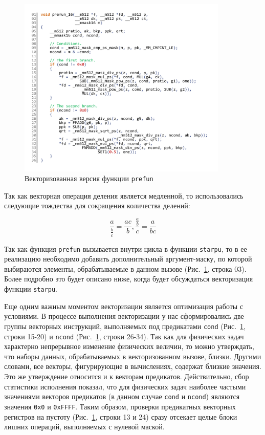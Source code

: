 \documentclass[utf8]{psta}
\begin{document}
\begin{figure}
\includegraphics[width=10cm]{pics/pic_prefun_16_code}
\caption{Векторизованная версия функции \texttt{prefun}}
\label{pic:prefun_16_code}
\end{figure}

Так как векторная операция деления является медленной, то использовались следующие тождества для сокращения количества делений:

\begin{equation}\label{eq:deldel}
\frac{a}{\frac{b}{c}} = \frac{ac}{b}, \frac{\frac{a}{b}}{c} = \frac{a}{bc}
\end{equation} 

Так как функция \texttt{prefun} вызывается внутри цикла в функции \texttt{starpu}, то в ее реализацию необходимо добавить дополнительный аргумент-маску, по которой выбираются элементы, обрабатываемые в данном вызове (Рис.~\ref{pic:prefun_16_code}, строка 03).
Более подробно это будет описано ниже, когда будет обсуждаться векторизация функции \texttt{starpu}.

Еще одним важным моментом векторизации является оптимизация работы с условиями.
В процессе выполнения векторизации у нас сформировались две группы векторных инструкций, выполняемых под предикатами \texttt{cond} (Рис.~\ref{pic:prefun_16_code}, строки 15-20) и \texttt{ncond} (Рис.~\ref{pic:prefun_16_code}, строки 26-34).
Так как для физических задач характерно непрерывное изменение физических величин, то можно утверждать, что наборы данных, обрабатываемых в векторизованном вызове, близки.
Другими словами, все векторы, фигурирующие в вычислениях, содержат близкие значения.
Это же утверждение относится и к векторам предикатов.
Действительно, сбор статистики исполнения показал, что для физических задач наиболее частыми значениями векторов предикатов (в данном случае \texttt{cond} и \texttt{ncond}) являются значения \texttt{0x0} и \texttt{0xFFFF}.
Таким образом, проверки предикатных векторных регистров на пустоту (Рис.~\ref{pic:prefun_16_code}, строки 13 и 24) сразу отсекает целые блоки лишних операций, выполняемых с нулевой маской.
\end{document}
